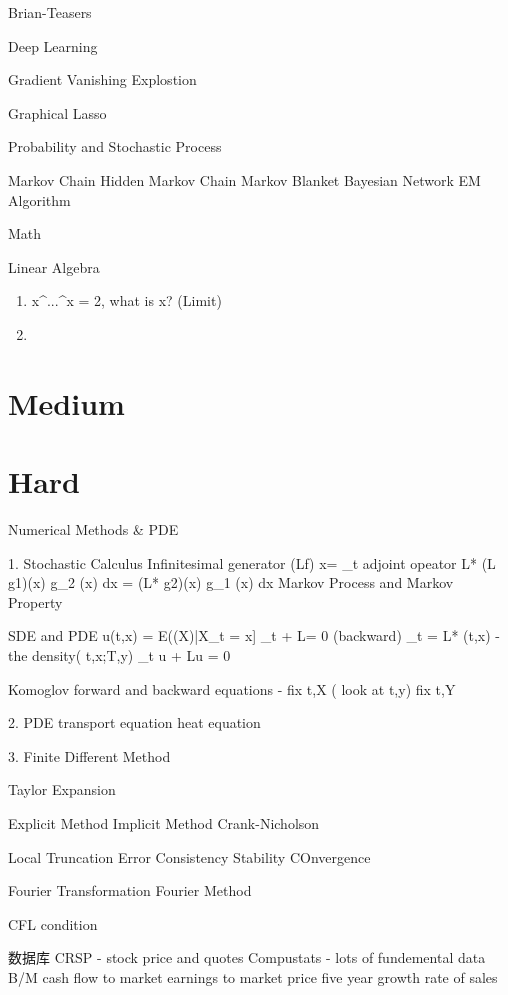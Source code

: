 \documentclass[11pt, openany]{book}              %
\begin{document}
Brian-Teasers

Deep Learning

Gradient Vanishing Explostion 


Graphical Lasso 

Probability and Stochastic Process 

Markov Chain
Hidden Markov Chain
Markov Blanket
Bayesian Network
EM Algorithm

Math

Linear Algebra

\begin{enumerate}
	\item x^...^x = 2, what is x? (Limit)
	\item 
\end{enumerate}


\section{Medium}
\section{Hard}


Numerical Methods & PDE

1. Stochastic Calculus
  	Infinitesimal generator
		(Lf) x= \lim_{\Delta t }
  		adjoint opeator L*
				\int (L g1)(x) g_2 (x) dx = \int (L* g2)(x) g_1 (x) dx
	Markov Process and Markov Property
  		
	SDE and PDE
	u(t,x) = E(\phi(X)|X_t = x] 
	\partial_t \Gamma + L\Gamma = 0 (backward)
        \partial_t \Gamma = L* \Gamma(t,x) 
         \Gamma - the density( t,x;T,y)
	\partial_t u + Lu  = 0

        Komoglov  forward and backward equations  - fix t,X ( look at t,y) 
               fix t,Y 


 2. PDE 
    transport equation
    heat equation 


3. Finite Different Method
   
   Taylor Expansion    
  
	Explicit Method      
	Implicit Method
	Crank-Nicholson

   Local Truncation Error 
     Consistency
     Stability 
    COnvergence

Fourier Transformation
Fourier Method

CFL condition
  

数据库
CRSP - stock price and quotes
Compustats - lots of fundemental data 
     B/M
      cash flow to market
       earnings to market price
       five year growth rate of sales 
\end{document}
